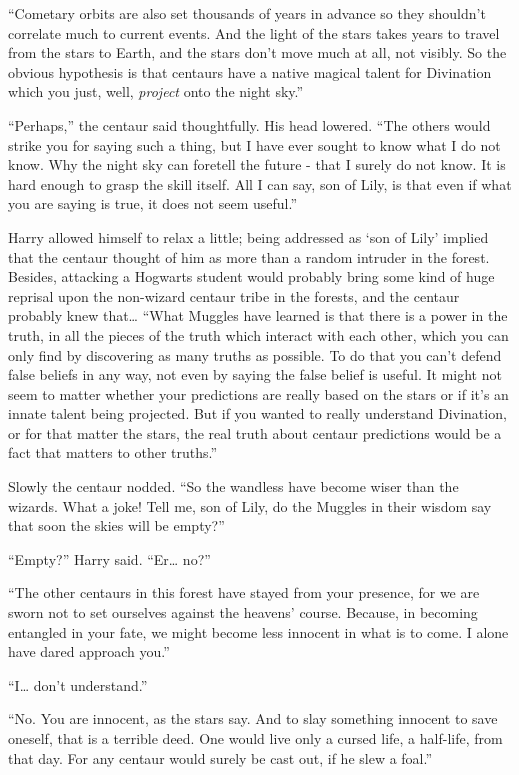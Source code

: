 ``Cometary orbits are also set thousands of years in advance so they
shouldn't correlate much to current events. And the light of the stars
takes years to travel from the stars to Earth, and the stars don't move
much at all, not visibly. So the obvious hypothesis is that centaurs
have a native magical talent for Divination which you just, well,
\emph{project} onto the night sky.''

``Perhaps,'' the centaur said thoughtfully. His head lowered. ``The
others would strike you for saying such a thing, but I have ever sought
to know what I do not know. Why the night sky can foretell the future -
that I surely do not know. It is hard enough to grasp the skill itself.
All I can say, son of Lily, is that even if what you are saying is true,
it does not seem useful.''

Harry allowed himself to relax a little; being addressed as `son of
Lily' implied that the centaur thought of him as more than a random
intruder in the forest. Besides, attacking a Hogwarts student would
probably bring some kind of huge reprisal upon the non-wizard centaur
tribe in the forests, and the centaur probably knew that\ldots{} ``What
Muggles have learned is that there is a power in the truth, in all the
pieces of the truth which interact with each other, which you can only
find by discovering as many truths as possible. To do that you can't
defend false beliefs in any way, not even by saying the false belief is
useful. It might not seem to matter whether your predictions are really
based on the stars or if it's an innate talent being projected. But if
you wanted to really understand Divination, or for that matter the
stars, the real truth about centaur predictions would be a fact that
matters to other truths.''

Slowly the centaur nodded. ``So the wandless have become wiser than the
wizards. What a joke! Tell me, son of Lily, do the Muggles in their
wisdom say that soon the skies will be empty?''

``Empty?'' Harry said. ``Er\ldots{} no?''

``The other centaurs in this forest have stayed from your presence, for
we are sworn not to set ourselves against the heavens' course. Because,
in becoming entangled in your fate, we might become less innocent in
what is to come. I alone have dared approach you.''

``I\ldots{} don't understand.''

``No. You are innocent, as the stars say. And to slay something innocent
to save oneself, that is a terrible deed. One would live only a cursed
life, a half-life, from that day. For any centaur would surely be cast
out, if he slew a foal.''


